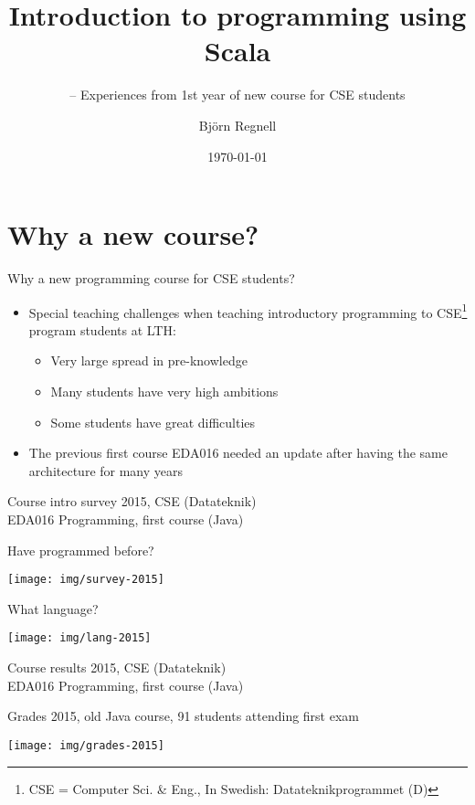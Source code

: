 \documentclass{lecturenotes}
\title[Scala introduktion]{Introduction to programming using Scala}
\subtitle{-- Experiences from 1st year of new course for CSE students}
\author{Björn Regnell}
\institute{Dept. of Computer Science, LTH \\ Lund University, Sweden \\ \vspace{1em}Download slides:\\ \url{https://github.com/lunduniversity/introprog/blob/master/about/course-experience-first-year}}
\date{\today}
\newcommand{\Section}[1]{\section{#1}\frame{\centering\huge\bfseries\textcolor{blue}{#1}}}
\begin{document}
\frame{\titlepage}
\frame{\tableofcontents}


\Section{Why a new course?}

\begin{Slide}{Why a new programming course for CSE students?}

\begin{itemize}
\item Special teaching challenges when teaching introductory programming to CSE\footnote{CSE = Computer Sci. \& Eng., In Swedish: Datateknikprogrammet (D)} program students at LTH:
\begin{itemize}
\item Very large spread in pre-knowledge
\item Many students have very high ambitions
\item Some students have great difficulties
\end{itemize}
\item The previous first course EDA016 needed an update after having the same architecture for many years
\end{itemize}
\end{Slide}

\begin{Slide}{Course intro survey 2015, CSE (Datateknik)\\EDA016 Programming, first course (Java)}
\begin{multicols}{2}
Have programmed before? \vspace{1em}

\texttt{[image: img/survey-2015]}
\columnbreak

\raggedleft What language?  \vspace{1em}

\texttt{[image: img/lang-2015]}
\end{multicols}
\end{Slide}


\begin{Slide}{Course results 2015, CSE (Datateknik)\\EDA016 Programming, first course (Java)}

Grades 2015, old Java course,  91 students attending first exam
\vspace{2em}

\texttt{[image: img/grades-2015]}


\end{Slide}
\end{document}
